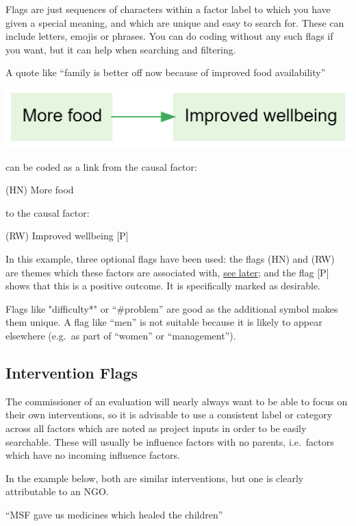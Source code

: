 \documentclass[
]{book}
\begin{document}
Flags are just sequences of characters within a factor label to which you have given a special meaning, and which are unique and easy to search for. These can include letters, emojis or phrases. You can do coding without any such flags if you want, but it can help when searching and filtering.

A quote like ``family is better off now because of improved food availability''

\includegraphics{_assets/image-20210109114200339-16315605320862.png}

can be coded as a link from the causal factor:

(HN) More food

to the causal factor:

(RW) Improved wellbeing {[}P{]}

In this example, three optional flags have been used: the flags (HN) and (RW) are themes which these factors are associated with, \href{https://guide.causalmap.app/creating.html\#intervention-flags}{see later}; and the flag {[}P{]} shows that this is a positive outcome. It is specifically marked as desirable.

Flags like "difficulty*" or ``\#problem'' are good as the additional symbol makes them unique. A flag like ``men'' is not suitable because it is likely to appear elsewhere (e.g.~as part of ``women'' or ``management'').

\hypertarget{intervention-flags}{%
\subsection{Intervention Flags}\label{intervention-flags}}

The commissioner of an evaluation will nearly always want to be able to focus on their own interventions, so it is advisable to use a consistent label or category across all factors which are noted as project inputs in order to be easily searchable. These will usually be influence factors with no parents, i.e.~factors which have no incoming influence factors.

In the example below, both are similar interventions, but one is clearly attributable to an NGO.

``MSF gave us medicines which healed the children''
\end{document}
